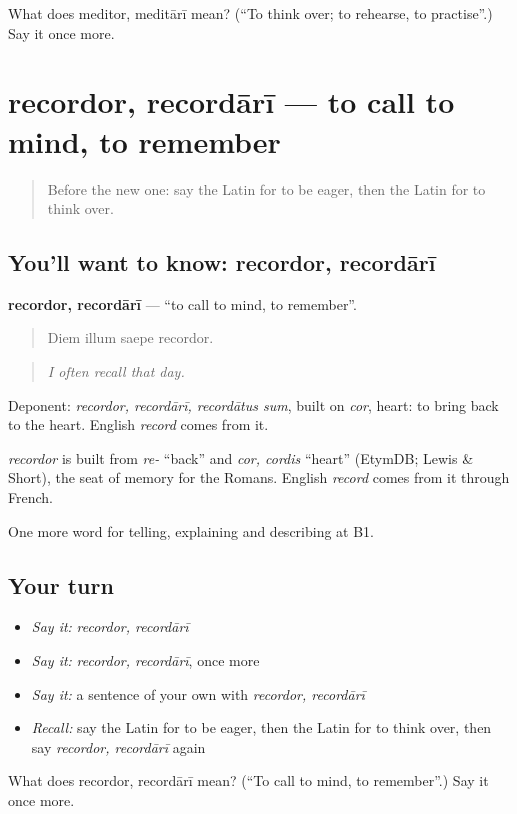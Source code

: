 \begin{tcolorbox}[breakable,colback=teal!4,colframe=teal!35!black,title={Before you move on}]
What does meditor, meditārī mean? (\textquotedblleft{}To think over; to rehearse, to practise\textquotedblright{}.) Say it once more.
\end{tcolorbox}
\section[recordor, recordārī]{recordor, recordārī — to call to mind, to remember}

\label{lesson:LA-C402-recordor}



\begin{quote}
Before the new one: say the Latin for to be eager, then the Latin for to think over.
\end{quote}

\subsection*{You'll want to know: recordor, recordārī}
\textbf{recordor, recordārī} — \textquotedblleft{}to call to mind, to remember\textquotedblright{}.

\begin{quote}
Diem illum saepe recordor.
\end{quote}

\begin{quote}
\emph{I often recall that day.}
\end{quote}

Deponent: \emph{recordor, recordārī, recordātus sum}, built on \emph{cor}, heart: to bring back to the heart. English \emph{record} comes from it.

\begin{cousinweb}
\emph{recordor} is built from \emph{re-} \textquotedblleft{}back\textquotedblright{} and \emph{cor, cordis} \textquotedblleft{}heart\textquotedblright{} (EtymDB; Lewis \& Short), the seat of memory for the Romans. English \emph{record} comes from it through French.
\end{cousinweb}

\begin{grammarlens}[title={What you've built}]
One more word for telling, explaining and describing at B1.
\end{grammarlens}

\subsection*{Your turn}
\begin{itemize}
\raggedright
  \item \emph{Say it:} \emph{recordor, recordārī}
  \item \emph{Say it:} \emph{recordor, recordārī}, once more
  \item \emph{Say it:} a sentence of your own with \emph{recordor, recordārī}
  \item \emph{Recall:} say the Latin for to be eager, then the Latin for to think over, then say \emph{recordor, recordārī} again
\end{itemize}

\begin{tcolorbox}[breakable,colback=teal!4,colframe=teal!35!black,title={Before you move on}]
What does recordor, recordārī mean? (\textquotedblleft{}To call to mind, to remember\textquotedblright{}.) Say it once more.
\end{tcolorbox}
